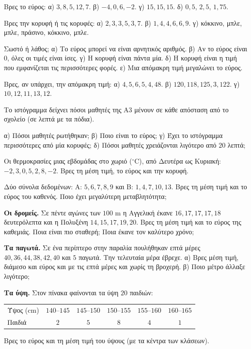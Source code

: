 \ex Βρες το εύρος: α) $3,8,5,12,7$. β) $-4,0,6,-2$. γ) $15,15,15$. δ) $0{,}5$, $2{,}5$, $1{,}75$.

\ex Βρες την κορυφή ή τις κορυφές: α) $2,3,3,5,3,7$. β) $1,4,4,6,6,9$. γ) κόκκινο, μπλε, μπλε, πράσινο, κόκκινο, μπλε.

\ex Σωστό ή λάθος; α) Το εύρος μπορεί να είναι αρνητικός αριθμός. β) Αν το εύρος είναι $0$, όλες οι τιμές είναι ίσες. γ) Η κορυφή είναι πάντα μία. δ) Η κορυφή είναι η τιμή που εμφανίζεται τις περισσότερες φορές. ε) Μια απόμακρη τιμή μεγαλώνει το εύρος.

\ex Βρες, αν υπάρχει, την απόμακρη τιμή: α) $4,5,6,5,4,48$. β) $120,118,125,3,122$. γ) $10,12,11,13,12$.

\ex Το ιστόγραμμα δείχνει πόσοι μαθητές της Α3 μένουν σε κάθε απόσταση από το σχολείο (σε λεπτά με τα πόδια).
\begin{center}
\end{center}
α) Πόσοι μαθητές ρωτήθηκαν; β) Ποιο είναι το εύρος; γ) Έχει το ιστόγραμμα περισσότερες από μία κορυφές; δ) Πόσοι μαθητές χρειάζονται λιγότερο από $20$ λεπτά;

\ex Οι θερμοκρασίες μιας εβδομάδας στο χωριό ($^\circ$C), από Δευτέρα ως Κυριακή: $-2, 3, 0, 5, 2, 8, -2$. Βρες τη μέση τιμή, το εύρος και την κορυφή.

\ex Δύο σύνολα δεδομένων: Α: $5,6,7,8,9$ και Β: $1,4,7,10,13$. Βρες τη μέση τιμή και το εύρος του καθενός. Ποιο έχει μεγαλύτερη μεταβλητότητα;


\ex \textbf{Οι δρομείς.} Σε πέντε αγώνες των $100$ m η Αγγελική έκανε $16, 17, 17, 17, 18$ δευτερόλεπτα και η Πολυξένη $14, 15, 17, 19, 20$. Βρες τη μέση τιμή και το εύρος της καθεμιάς. Ποια είναι πιο σταθερή; Ποια έκανε τον καλύτερο χρόνο;

\ex \textbf{Τα παγωτά.} Σε ένα περίπτερο στην παραλία πουλήθηκαν επτά μέρες $40, 36, 44, 38, 42, 40$ και $5$ παγωτά. Την τελευταία μέρα έβρεχε. α) Βρες μέση τιμή, διάμεσο και εύρος και με τις επτά μέρες και χωρίς τη βροχερή. β) Ποιο μέτρο άλλαξε λιγότερο;

\ex \textbf{Τα ύψη.} Στον πίνακα φαίνονται τα ύψη $20$ παιδιών:\par
\begin{center}
\renewcommand{\arraystretch}{1.25}
\begin{tabular}{lccccc}
\toprule
Ύψος (cm) & $140$--$145$ & $145$--$150$ & $150$--$155$ & $155$--$160$ & $160$--$165$\\
Παιδιά & $2$ & $5$ & $8$ & $4$ & $1$\\
\bottomrule
\end{tabular}
\end{center}
Βρες το εύρος και τη μέση τιμή του ύψους (με τα κέντρα των κλάσεων).

